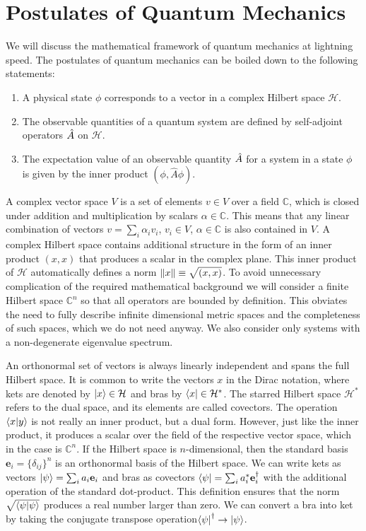\section{Postulates of Quantum Mechanics}

We will discuss the mathematical framework of quantum mechanics at lightning speed.
The postulates of quantum mechanics can be boiled down to the following statements:
\begin{enumerate}
    \item A physical state $\phi$ corresponds to a vector in a complex Hilbert space $\mathcal{H}$.
    \item The observable quantities of a quantum system are defined by self-adjoint operators $\Hat{A}$ on $\mathcal{H}$.
    \item The expectation value of an observable quantity $\Hat{A}$ for a system in a  state $\phi$ is given by the inner product $(\phi,\hat{A}\phi)$.
\end{enumerate}
A complex vector space $V$ is a set of elements $v\in V$ over a field $\mathbb{C}$, which is closed under addition and multiplication by scalars $\alpha\in \mathbb{C}$. This means that any linear combination of vectors $v = \sum_i \alpha_i v_i$, $v_i\in V$, $\alpha \in \mathbb{C}$ is also contained in $V$. A complex Hilbert space contains additional structure in the form of an inner product $(x,x)$ that produces a scalar in the complex plane. This inner product of $\mathcal{H}$ automatically defines a norm $\norm{x} \equiv \sqrt{( x, x )}$. To avoid unnecessary complication of the required mathematical background we will consider a finite Hilbert space $\mathbb{C}^n$ so that all operators are bounded by definition. This obviates the need to fully describe infinite dimensional metric spaces and the completeness of such spaces, which we do not need anyway. We also consider only systems with a non-degenerate eigenvalue spectrum.\newline 

\noindent An orthonormal set of vectors is always linearly independent and spans the full Hilbert space. It is common to write the vectors $x$ in the Dirac notation, where kets are denoted by $\ket{x}\in \mathcal{H}$ and bras by $\bra{x}\in \mathcal{H}^*$. The starred Hilbert space $\mathcal{H}^*$ refers to the dual space, and its elements are called covectors. The operation $\braket{x}{y}$ is not really an inner product, but a dual form. However, just like the inner product, it produces a scalar over the field of the respective vector space, which in the case is $\mathbb{C}^n$. If the Hilbert space is $n$-dimensional, then the standard basis $\mathbf{e}_i=\{\delta_{ij}\}^n$ is an orthonormal basis of the Hilbert space. We can write kets as vectors $\ket{\psi} = \sum_{i} a_i \mathbf{e}_i$ and bras as covectors $\bra{\psi} = \sum_{i} a_i^* \mathbf{e}_i^\dagger$ with the additional operation of the standard dot-product. This definition ensures that the norm $\sqrt{\braket{\psi}{\psi}}$ produces a real number larger than zero. We can convert a bra into ket by taking the conjugate transpose operation$\bra{\psi}^\dagger\rightarrow\ket{\psi}$.\newline

